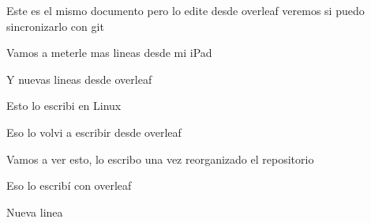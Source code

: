 \documentclass{article}
\begin{document}
	Este  es el mismo documento pero lo edite desde overleaf veremos si  puedo sincronizarlo con git
	
Vamos a meterle mas lineas desde mi iPad

Y nuevas lineas desde overleaf

Esto lo escribi en Linux


Eso lo volvi a escribir desde overleaf

Vamos a ver esto, lo escribo una vez reorganizado el repositorio

Eso lo escribí con overleaf


Nueva linea

 
\end{document}
